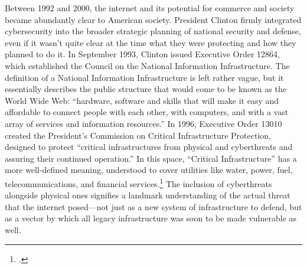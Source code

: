\documentclass{report}
\begin{document}
\begin{refsegment}
Between 1992 and 2000, the internet and its potential for commerce and society became abundantly clear to American society. President Clinton firmly integrated cybersecurity into the broader strategic planning of national security and defense, even if it wasn't quite clear at the time what they were protecting and how they planned to do it. In September 1993, Clinton issued Executive Order 12864, which established the Council on the National Information Infrastructure. The definition of a National Information Infrastructure is left rather vague, but it essentially describes the public structure that would come to be known as the World Wide Web: ``hardware, software and skills that will make it easy and affordable to connect people with each other, with computers, and with a vast array of services and information resources.'' In 1996, Executive Order 13010 created the President's Commission on Critical Infrastructure Protection, designed to protect ``critical infrastructures from physical and cyberthreats and assuring their continued operation.'' In this space, ``Critical Infrastructure'' has a more well-defined meaning, understood to cover utilities like water, power, fuel, telecommunications, and financial services.\footcite[~p.761. Completely omitted from this thesis is the concurrent debate about the role the government should play in regulating encryption technology. At the same time it was drafting the Executive Orders mentioned above, the Clinton administration was also taking executive action to manage encryption. The encryption debate (which is still ongoing today) raises a lot of questions about the relationship between the federal government, civil liberties, and law enforcement, as well as more generic national security concerns. It is however mostly irrelevant the specific international political questions that motivate this inquriy, and as such is not included here.]{boys_clinton_2018} The inclusion of cyberthreats alongside physical ones signifies a landmark understanding of the actual threat that the internet posed---not just as a new system of infrastructure to defend, but as a vector by which all legacy infrastructure was soon to be made vulnerable as well.


\end{refsegment}
\end{document}
